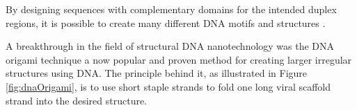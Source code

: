 

By designing sequences with complementary domains for the intended duplex regions, it is possible to create many different DNA motifs and structures \cite{seeman_2016}.


A breakthrough in the field of structural DNA nanotechnology was the DNA origami technique \cite{rothemund2006folding} a now popular and proven method for creating larger irregular structures using DNA. The principle behind it, as illustrated in Figure \ref{fig:dnaOrigami}, is to use short staple strands to fold one long viral scaffold strand into the desired structure.

